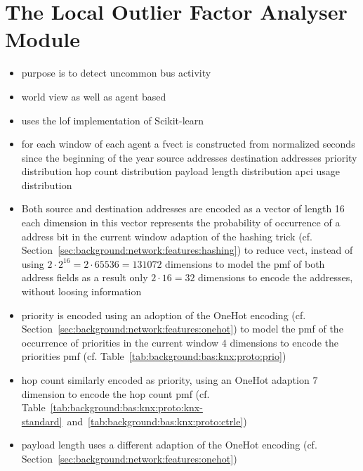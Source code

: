 \section{The Local Outlier Factor Analyser Module}
\label{sec:impl:lof}

\begin{itemize}
	\item purpose is to detect uncommon bus activity
	\item world view as well as agent based
	\item uses the \gls{lof} implementation of Scikit-learn \parencite{Pedregosa2011}
	
	\item for each window of each agent a \gls{fvect} is constructed from
		\subitem normalized seconds since the beginning of the year
		\subitem source addresses
		\subitem destination addresses
		\subitem priority distribution
		\subitem hop count distribution
		\subitem payload length distribution
		\subitem \gls{apci} usage distribution
	\item Both source and destination addresses are encoded as a vector of length 16
		\subitem each dimension in this vector represents the probability of occurrence of a address bit in the current window
		\subitem adaption of the hashing trick (cf. Section~\ref{sec:background:network:features:hashing})
		\subitem to reduce \gls{vect}, instead of using $2 \cdot 2^16 = 2 \cdot 65536 = 131072$ dimensions to model the \gls{pmf} of both address fields
		\subitem as a result only $2 \cdot 16 = 32$ dimensions to encode the addresses, without loosing information
	\item priority is encoded using an adoption of the OneHot encoding (cf. Section~\ref{sec:background:network:features:onehot}) to model the \gls{pmf} of the occurrence of priorities in the current window
		\subitem $4$ dimensions to encode the priorities \gls{pmf} (cf. Table~\ref{tab:background:bas:knx:proto:prio})
	\item hop count similarly encoded as priority, using an OneHot adaption
		\subitem $7$ dimension to encode the hop count \gls{pmf} (cf. Table~\ref{tab:background:bas:knx:proto:knx-standard}~and~\ref{tab:background:bas:knx:proto:ctrle})
	\item payload length uses a different adaption of the OneHot encoding (cf. Section~\ref{sec:background:network:features:onehot})

\end{itemize}
